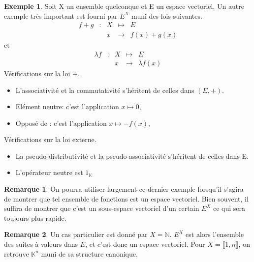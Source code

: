 \documentclass[french]{book}
\theoremstyle{plain}
\theoremstyle{definition}
\newtheorem{exa}{Exemple}[chapter]
\newtheorem{rmq}{Remarque}[chapter]
\theoremstyle{remark}
\begin{document}
\begin{exa}
	Soit X un ensemble quelconque et E un espace vectoriel. Un autre exemple très important est fourni par \(E^{X}\) muni des lois suivantes.
$$\begin{array}{ccccc}f+g&:&X&\mapsto&E\\ &&x&\rightarrow&f(x)+g(x)\end{array}$$ et $$\begin{array}{ccccc}\lambda f&:&X&\mapsto&E\\ &&x&\rightarrow&\lambda f(x)\end{array}$$
Vérifications sur la loi +.
\begin{itemize}
\item L'associativité et la commutativité s'héritent de celles dans \((E,+).\)
\item Elément neutre: c'est l'application \(x\mapsto0,\)
\item Opposé de : c'est l'application \(x\mapsto-f(x),\)
\end{itemize}
Vérifications sur la loi externe.
\begin{itemize}
	\item La pseudo-distributivité et la pseudo-associativité s'héritent de celles dans E.
	\item L'opérateur neutre est $1_{\mathbb{K}}$
\end{itemize}
\end{exa}
\begin{rmq}
	On pourra utiliser largement ce dernier exemple lorsqu'il s'agira de montrer que tel ensemble de fonctions est un espace vectoriel. Bien souvent, il suffira de montrer que c'est un sous-espace vectoriel d'un certain $E^{X}$ ce qui sera toujours plus rapide.
\end{rmq}
\begin{rmq}
	Un cas particulier est donné par $X=\mathbb{N}$. $E^{X}$ est alors l'ensemble des suites à valeurs dans $E$, et c'est donc un espace vectoriel. Pour $X=\llbracket1,n\rrbracket$, on retrouve $\mathbb{K}^{n}$ muni de sa structure canonique.
\end{rmq}
\end{document}
